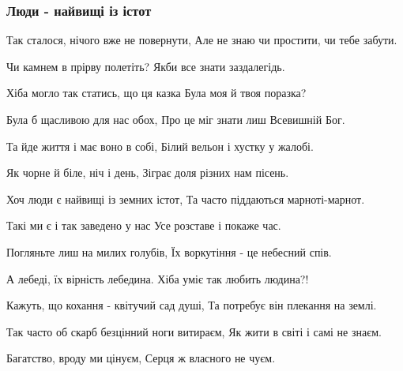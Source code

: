  
 
 

\subsubsection{Люди - найвищі із істот}
\label{sec:poetry.rus.olesja_gavryshko.ljudy}

Так сталося, нічого вже не повернути,
Але не знаю чи простити, чи тебе забути.

Чи камнем в прірву полетіть?
Якби все знати заздалегідь.

Хіба могло так статись, що ця казка
Була моя й твоя поразка?

Була б щасливою для нас обох,
Про це міг знати лиш Всевишній Бог.

Та йде життя і має воно в собі,
Білий вельон і хустку у жалобі.

Як чорне й біле, ніч і день,
Зіграє доля різних нам пісень.

Хоч люди є найвищі із земних істот,
Та часто піддаються марноті-марнот.

Такі ми є і так заведено у нас
Усе розставе і покаже час.

Погляньте лиш на милих голубів,
Їх воркутіння - це небесний спів.

А лебеді, їх вірність лебедина.
Хіба уміє так любить людина?!

Кажуть, що кохання - квітучий сад душі,
Та потребує він плекання на землі.

Так часто об скарб безцінний ноги витираєм,
Як жити в світі і самі не знаєм.

Багатство, вроду ми цінуєм,
Серця ж власного не чуєм.
